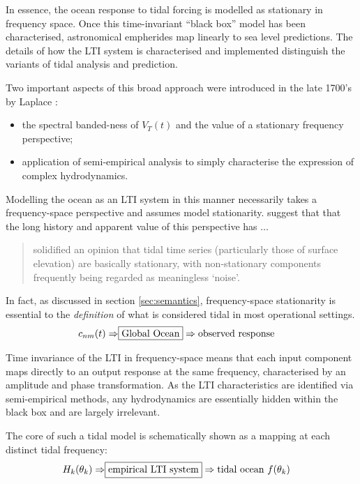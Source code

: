 In essence, the ocean response to tidal forcing is modelled as stationary in frequency space.  Once this time-invariant ``black box'' model has been characterised, astronomical empherides map linearly to sea level predictions.  The details of how the LTI system is characterised and implemented distinguish the variants of tidal analysis and prediction.

Two important aspects of this broad approach were introduced in the late 1700's by Laplace \cite[chpt 7]{Cartwright:2000tt}:
\begin{itemize}
    \item the spectral banded-ness of $V_T(t)$ and the value of a stationary frequency perspective;
    \item application of semi-empirical analysis to simply characterise the expression of complex hydrodynamics. 
\end{itemize}

Modelling the ocean as an LTI system in this manner necessarily takes a frequency-space perspective and assumes model stationarity. \citet{Jay:2003bj} suggest that that the long history and apparent value of this perspective has $\dots$
\begin{quotation}
solidified an opinion that tidal time series (particularly those of surface elevation) are basically stationary, with non-stationary components frequently being regarded as meaningless `noise'.    
\end{quotation}
In fact, as discussed in section \ref{sec:semantics}, frequency-space stationarity is essential to the \emph{definition} of what is considered tidal in most operational settings.
\begin{align}
    c_{nm}(t) \Rightarrow & \fbox{Global Ocean}\Rightarrow \mbox{observed response} \nonumber
\end{align}

Time invariance of the LTI in frequency-space means that each input component maps directly to an output response at the same frequency, characterised by an amplitude and phase transformation.   As the LTI characteristics are identified via semi-empirical methods, any hydrodynamics are essentially hidden within the black box and are largely irrelevant.

The core of such a tidal model is schematically shown as a mapping at each distinct tidal frequency:
\begin{align}
    H_{k}(\theta_k) \Rightarrow & \fbox{empirical LTI system} \Rightarrow \mbox{tidal ocean $f(\theta_k)$}  %
    \label{eq:LTI}
\end{align}

